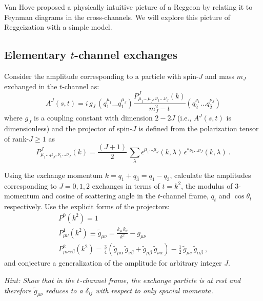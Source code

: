 Van Hove proposed a physically intuitive picture of a Reggeon by relating it to Feynman diagrams in the cross-channels. We will explore this picture of Reggeization with a simple model.

\subsection{Elementary $t$-channel exchanges}
Consider the amplitude corresponding to a particle with spin-$J$ and mass $m_J$  exchanged in the $t$-channel as:
    \begin{equation}   
        \label{eq:AJ}
        A^J(s,t) = i \, g_J \, \left( q_1^{\mu_1} \dots q_1^{\mu_J} \right) \frac{P^J_{\mu_1\dots\mu_J,\nu_1\dots\nu_J}(k)}{m_J^2 - t} \left( q_{\bar{2}}^{\nu_1} \dots q_{\bar{2}}^{\nu_J} \right) 
    \end{equation}
where $g_J$ is a coupling constant with dimension $2-2J$ (i.e., $A^J(s,t)$ is dimensionless) and the projector of spin-$J$ is defined from the polarization tensor of rank-$J\geq1$ as
    \begin{equation}
        P^J_{\mu_1\dots\mu_J,\nu_1\dots\nu_J}(k) = \frac{(J+1)}{2} \, \sum_{\lambda} 
         \epsilon^{\mu_1\dots\mu_J}(k,\lambda) \, \epsilon^{*\nu_1\dots\nu_J}(k,\lambda) ~.
    \end{equation}

Using the exchange momentum $k = q_1 + q_{\bar{3}} = q_1 - q_3$, calculate the amplitudes corresponding to $J=0,1,2$ exchanges in terms of $t= k^2$, the modulus of 3-momentum and cosine of scattering angle in the $t$-channel frame, $q_t$ and $\cos\theta_t$ respectively. Use the explicit forms of the projectors:
    \begin{gather}
        P^0(k^2) = 1 \\
        P^1_{\mu\nu}(k^2) \equiv \tilde{g}_{\mu\nu} =   \frac{ k_\mu \, k_\nu}{ k^2} - g_{\mu\nu}\\ 
        P^2_{\mu\nu\alpha\beta}(k^2) = \frac{3}{4}\left(\tilde{g}_{\mu\alpha} \, \tilde{g}_{\nu\beta} + \tilde{g}_{\mu\beta} \, \tilde{g}_{\nu\alpha}\right) - \frac{1}{2} \, \tilde{g}_{\mu\nu} \, \tilde{g}_{\alpha\beta} ~,
    \end{gather}
and conjecture a generalization of the amplitude for arbitrary integer $J$. 

\noindent\textit{Hint: Show that in the $t$-channel frame, the exchange particle is at rest and therefore $\tilde{g}_{\mu\nu}$ reduces to a $\delta_{ij}$ with respect to only spacial momenta.} 

